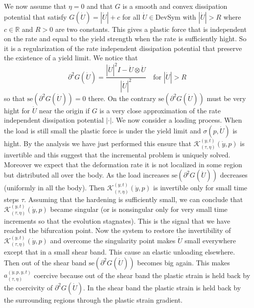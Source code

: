 We now assume that $\eta=0$ and that $G$ is a smooth and convex dissipation potential that satisfy $G(\dot U)=|\dot U|+c$ for all $\dot U\in\text{DevSym}$ with $|\dot U|>R$ where $c\in\mathbb{R}$ and $R>0$ are two constants. This gives a plastic force that is independent on the rate and equal to the yield strength when the rate is sufficiently hight. So it is a regularization of the rate independent dissipation potential that preserve the existence of a yield limit. We notice that
\[
\partial^2G(\dot U)=\frac{|\dot U|^2I-\dot U\otimes\dot U}{|\dot U|^2}\quad\text{for $|\dot U|>R$}
\]
so that $\text{se}(\partial^2G(\dot U))=0$ there. On the contrary $\text{se}(\partial^2G(\dot U))$ must be very hight for $\dot U$ near the origin if $G$ is a very close approximation of the rate independent dissipation potential $|\cdot|$. We now consider a loading process. When the load is still small the plastic force is under the yield limit and $\sigma(p,\dot U)$ is hight. By the analysis we have just performed this ensure that $\mathcal{K}_{(\tau,\eta)}^{(y,t)}(\dot y,p)$ is invertible and this suggest that the incremental problem is uniquely solved. Moreover we expect that the deformation rate it is not localized in some region but distributed all over the body. As the load increases $\text{se}(\partial^2G(\dot U))$ decreases (uniformly in all the body). Then $\mathcal{K}_{(\tau,\eta)}^{(y,t)}(\dot y,p)$ is invertible only for small time steps $\tau$. Assuming that the hardening is sufficiently small, we can conclude that $\mathcal{K}_{(\tau,\eta)}^{(y,t)}(\dot y,p)$ became singular (or is nonsingular only for very small time increments so that the evolution stagnates). This is the signal that we have reached the bifurcation point. Now the system to restore the invertibility of $\mathcal{K}_{(\tau,\eta)}^{(y,t)}(\dot y,p)$ and overcome the singularity point makes $\dot U$ small everywhere except that in a small shear band. This cause an elastic unloading elsewhere. Then out of the shear band $\text{se}(\partial^2G(\dot U))$ becomes big again. This makes $a_{(\tau,\eta)}^{(\dot y,p,y,t)}$ coercive because out of the shear band the plastic strain is held back by the coercivity of $\partial^2G(\dot U)$. In the shear band the plastic strain is held back by the surrounding regions through the plastic strain gradient.


